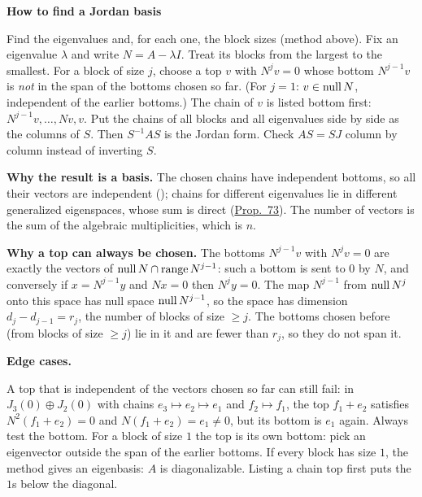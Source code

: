 \documentclass[10pt]{scrartcl}
\newenvironment{methodbox}[1]{\begin{mdframed}[style=mdbluebox,linecolor=NavyBlue,backgroundcolor=NavyBlue!3]\textbf{\color{NavyBlue}#1}\par\vspace{2pt}}{\end{mdframed}}
\begin{document}
\begin{methodbox}{How to find a Jordan basis}
\begin{enumerate}[label=\arabic*.,leftmargin=1.5em,itemsep=2pt,topsep=2pt]
  \ii Find the eigenvalues and, for each one, the block sizes (method above).
  \ii Fix an eigenvalue $\lambda$ and write $N=A-\lambda I$. Treat its blocks from the largest to the smallest. For a block of size $j$, choose a top $v$ with $N^jv=0$ whose bottom $N^{j-1}v$ is \emph{not} in the span of the bottoms chosen so far. (For $j=1$: $v\in\operatorname{null} N$, independent of the earlier bottoms.)
  \ii The chain of $v$ is listed bottom first: $N^{j-1}v,\dots,Nv,v$.
  \ii Put the chains of all blocks and all eigenvalues side by side as the columns of $S$. Then $S^{-1}AS$ is the Jordan form. Check $AS=SJ$ column by column instead of inverting $S$.
\end{enumerate}
\textbf{Why the result is a basis.} The chosen chains have independent bottoms, so all their vectors are independent (); chains for different eigenvalues lie in different generalized eigenspaces, whose sum is direct (\hyperref[prop-73]{Prop.~73}). The number of vectors is the sum of the algebraic multiplicities, which is $n$.

\textbf{Why a top can always be chosen.} The bottoms $N^{j-1}v$ with $N^jv=0$ are exactly the vectors of $\operatorname{null} N\cap\operatorname{range} N^{j-1}$: such a bottom is sent to $0$ by $N$, and conversely if $x=N^{j-1}y$ and $Nx=0$ then $N^jy=0$. The map $N^{j-1}$ from $\operatorname{null} N^j$ onto this space has null space $\operatorname{null} N^{j-1}$, so the space has dimension $d_j-d_{j-1}=r_j$, the number of blocks of size $\ge j$. The bottoms chosen before (from blocks of size $\ge j$) lie in it and are fewer than $r_j$, so they do not span it.

\textbf{Edge cases.}
\begin{itemize}
  \ii A top that is independent of the vectors chosen so far can still fail: in $J_3(0)\oplus J_2(0)$ with chains $e_3\mapsto e_2\mapsto e_1$ and $f_2\mapsto f_1$, the top $f_1+e_2$ satisfies $N^2(f_1+e_2)=0$ and $N(f_1+e_2)=e_1\ne0$, but its bottom is $e_1$ again. Always test the bottom.
  \ii For a block of size $1$ the top is its own bottom: pick an eigenvector outside the span of the earlier bottoms.
  \ii If every block has size $1$, the method gives an eigenbasis: $A$ is diagonalizable.
  \ii Listing a chain top first puts the $1$s below the diagonal.
\end{itemize}
\end{methodbox}
\end{document}
